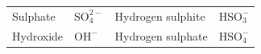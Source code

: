 {{\begin{center}
\begin{xtabular}[t]{|l|l|l|l|}
    
        Sulphate &
    
    
        \begin{math}\mathrm{SO}_{4}^{2-}\end{math} &
    
    
        Hydrogen sulphite &
    
    
        \begin{math}\mathrm{HSO}_{3}^{-}\end{math}%
     \tabularnewline{}
    
    
        Hydroxide &
    
    
        \begin{math}{\mathrm{OH}}^{-}\end{math} &
    
    
        Hydrogen sulphate &
    
    
        \begin{math}\mathrm{HSO}_{4}^{-}\end{math}%
     \tabularnewline{}
    

\end{xtabular}
\end{center}}}
